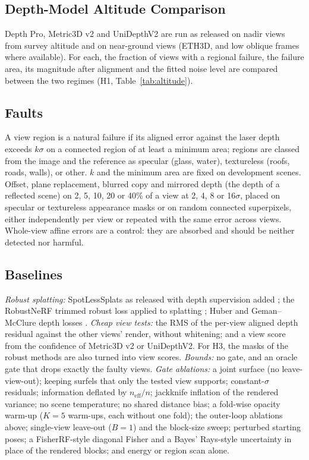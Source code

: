 \subsection{Depth-Model Altitude Comparison}
Depth Pro, Metric3D v2 and UniDepthV2 are run as released on nadir views from survey altitude and on
near-ground views (ETH3D, and low oblique frames where available). For each, the fraction of views with a
regional failure, the failure area, its magnitude after alignment and the fitted noise level are
compared between the two regimes (H1, Table~\ref{tab:altitude}).

\subsection{Faults}
 A view region is a natural failure if its aligned error against the laser depth
exceeds $k\sigma$ on a connected region of at least a minimum area; regions are classed from the image
and the reference as specular (glass, water), textureless (roofs, roads, walls), or other. $k$ and the minimum area
are fixed on development scenes.
 Offset, plane replacement, blurred copy and mirrored depth (the depth of a reflected
scene) on 2, 5, 10, 20 or 40\% of a view at 2, 4, 8 or 16$\sigma$, placed on specular or textureless
appearance masks or on random connected superpixels, either independently per view or repeated with
the same error across views. Whole-view affine errors are a control: they are absorbed and should be
neither detected nor harmful.

\subsection{Baselines}
\emph{Robust splatting:} SpotLessSplats as released with depth supervision added \cite{gs_spotless};
the RobustNeRF trimmed robust loss applied to splatting \cite{gs_robustnerf}; Huber and
Geman--McClure depth losses \cite{rob_blackrangarajan,rob_barron}. \emph{Cheap view tests:} the RMS of
the per-view aligned depth residual against the other views' render, without whitening; and a view
score from the confidence of Metric3D v2 or UniDepthV2. For H3, the masks of the robust methods are
also turned into view scores. \emph{Bounds:} no gate, and an oracle gate that drops exactly the faulty
views. \emph{Gate ablations:} a joint surface (no leave-view-out); keeping surfels that only the tested
view supports; constant-$\sigma$ residuals; information deflated by $n_{\mathrm{eff}}/n$; jackknife
inflation of the rendered variance; no scene temperature; no shared distance bias; a fold-wise opacity
warm-up ($K=5$ warm-ups, each without one fold); the outer-loop ablations above; single-view leave-out ($B=1$) and the block-size sweep; perturbed starting
poses; a FisherRF-style
diagonal Fisher \cite{unc_fisherrf} and a Bayes' Rays-style uncertainty \cite{unc_bayesrays} in place
of the rendered blocks; and energy or region scan alone.

